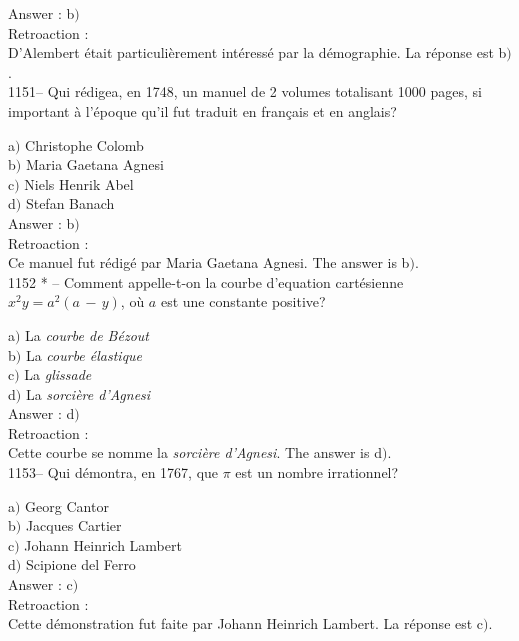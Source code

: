 ﻿\documentclass[letterpaper, 12pt]{article}
\begin{document}
Answer : b$)$\\

Retroaction : \\
D'Alembert \'etait particuli\`erement int\'eress\'e par la d\'emographie. La
r\'eponse est b$)$.\\

1151-- Qui r\'edigea, en 1748, un manuel de 2 volumes totalisant
1000 pages, si important \`a l'\'epoque qu'il fut traduit en fran\c
cais et en anglais?

a$)$ Christophe Colomb \\
b$)$ Maria Gaetana Agnesi \\
c$)$ Niels Henrik Abel \\
d$)$ Stefan Banach  \\

Answer : b$)$\\

Retroaction : \\
Ce manuel fut r\'edig\'e par Maria Gaetana Agnesi. The answer is b$)$.\\

1152 * -- Comment appelle-t-on la courbe d'equation cart\'esienne
$x^2y=a^2(a\,-\,y)$, o\`u $a$ est une constante positive?

a$)$ La {\sl courbe de B\'ezout} \\
b$)$ La {\sl courbe \'elastique}  \\
c$)$ La {\sl glissade} \\
d$)$ La {\sl sorci\`ere d'Agnesi}  \\

Answer : d$)$\\

Retroaction : \\
Cette courbe se nomme la {\sl sorci\`ere d'Agnesi}. The answer is d$)$.\\

1153-- Qui d\'emontra, en 1767, que $\pi$ est un nombre irrationnel?

a$)$ Georg Cantor \\
b$)$ Jacques Cartier \\
c$)$ Johann Heinrich Lambert \\
d$)$ Scipione del Ferro\\

Answer : c$)$\\

Retroaction : \\
Cette d\'emonstration fut faite par Johann Heinrich Lambert. La r\'eponse
est c$)$.\\
\end{document}
